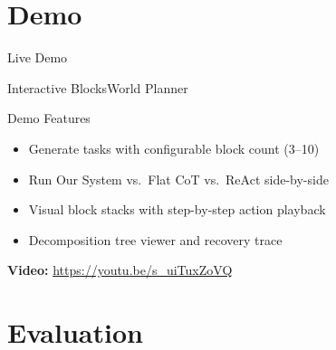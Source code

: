 \documentclass[aspectratio=169]{beamer}
\begin{document}
\section{Demo}

\begin{frame}{Live Demo}

\centering
\vspace{0.5cm}
{\Large Interactive BlocksWorld Planner}

\vspace{0.5cm}
\begin{block}{Demo Features}
\begin{itemize}
    \item Generate tasks with configurable block count (3--10)
    \item Run Our System vs.\ Flat CoT vs.\ ReAct side-by-side
    \item Visual block stacks with step-by-step action playback
    \item Decomposition tree viewer and recovery trace
\end{itemize}
\end{block}

\vspace{0.5cm}
\textbf{Video:} \url{https://youtu.be/s_uiTuxZoVQ}

\end{frame}

\section{Evaluation}
\end{document}
